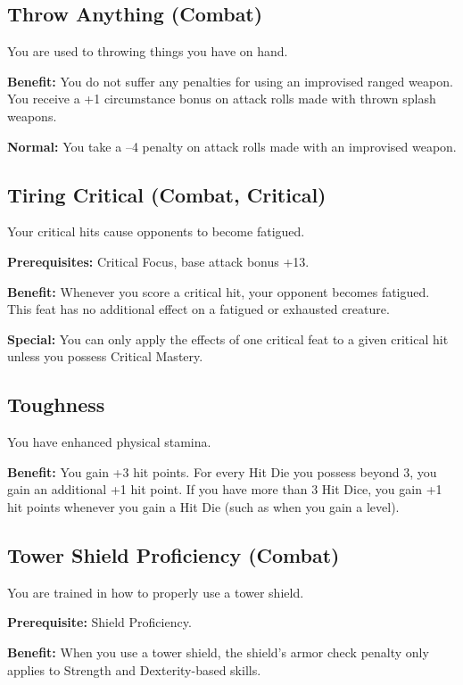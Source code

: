 \subsection{Throw Anything (Combat)}

				
You are used to throwing things you have on hand.
				
\textbf{Benefit:} You do not suffer any penalties for using an improvised ranged weapon. You receive a +1 circumstance bonus on attack rolls made with thrown splash weapons.
				
\textbf{Normal:} You take a --4 penalty on attack rolls made with an improvised weapon.
				
\subsection{Tiring Critical (Combat, Critical)}

				
Your critical hits cause opponents to become fatigued.
				
\textbf{Prerequisites:} Critical Focus, base attack bonus +13.
				
\textbf{Benefit:} Whenever you score a critical hit, your opponent becomes fatigued. This feat has no additional effect on a fatigued or exhausted creature.
				
\textbf{Special:} You can only apply the effects of one critical feat to a given critical hit unless you possess Critical Mastery.
				
\subsection{Toughness}

				
You have enhanced physical stamina.
				
\textbf{Benefit:} You gain +3 hit points. For every Hit Die you possess beyond 3, you gain an additional +1 hit point. If you have more than 3 Hit Dice, you gain +1 hit points whenever you gain a Hit Die (such as when you gain a level).
				
\subsection{Tower Shield Proficiency (Combat)}

				
You are trained in how to properly use a tower shield.
				
\textbf{Prerequisite:} Shield Proficiency.
				
\textbf{Benefit:} When you use a tower shield, the shield's armor check penalty only applies to Strength and Dexterity-based skills.
				
